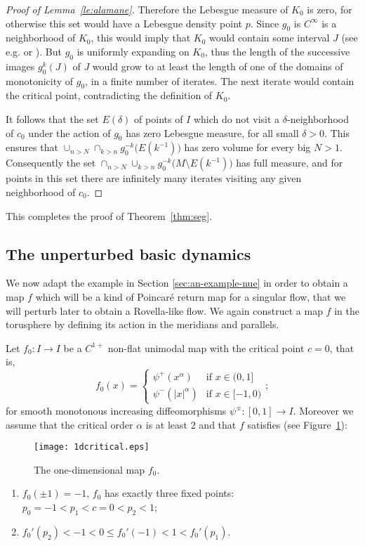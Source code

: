 \documentclass[reqno,12pt,a4paper]{amsart}
\theoremstyle{plain}
\theoremstyle{definition}
\begin{document}
\begin{proof}[Proof of Lemma~\ref{le:alamane}]
  Therefore the Lebesgue measure of $K_0$ is zero, for
  otherwise this set would have a Lebesgue density point
  $p$. Since $g_0$ is $C^\infty$ is a neighborhood of $K_0$,
  this would imply that $K_0$ would contain some interval
  $J$ (see e.g. \cite{Vi97b} or
  \cite{alves-luzzatto-pinheiro2005}). But $g_0$ is
  uniformly expanding on $K_0$, thus the length of the
  successive images $g_0^k(J)$ of $J$ would grow to at least
  the length of one of the domains of monotonicity of $g_0$,
  in a finite number of iterates. The next iterate would
  contain the critical point, contradicting the definition
  of $K_0$.

  It follows that the set $E(\delta)$ of points of $I$ which
  do not visit a $\delta$-neighborhood of $c_0$ under the
  action of $g_0$ has zero Lebesgue measure, for all small
  $\delta>0$. This ensures that $\cup_{n>N}\cap_{k>n}
  g_0^{-k}\big( E(k^{-1})\big)$ has zero volume for every
  big $N>1$. Consequently the set $\cap_{n>N}\cup_{k>n}
  g_0^{-k}\big(M\setminus E(k^{-1})\big)$ has full measure,
  and for points in this set there are infinitely many
  iterates visiting any given neighborhood of $c_0$.
\end{proof}

This completes the proof of Theorem~\ref{thm:seg}.

\subsection{The unperturbed basic dynamics}
\label{sec:unpert-basic-dynamic}

We now adapt the example in Section \ref{sec:an-example-nue}
in order to obtain a map $f$ which will be a kind of
Poincar\'e return map for a singular flow, that we will
perturb later to obtain a Rovella-like flow.  We again
construct a map $f$ in the torusphere by defining its action
in the meridians and parallels.

Let $f_0: I \to I$ be a $C^{1+}$ non-flat unimodal map with the
critical point $c=0$, that is,
$$
f_0(x)=\begin{cases}
\psi^+(x^\alpha) & \text{if   } x\in(0,1]\\
\psi^-(|x|^\alpha) & \text{if   } x\in[-1,0)
\end{cases};
$$
for smooth monotonous increasing diffeomorphisms
$\psi^\pm:[0,1]\to I$.  Moreover we assume that the critical
order $\alpha$ is at least $2$ and that $f$ satisfies (see
Figure~\ref{fig:1dcritical}):
\begin{figure}[htbp]
\begin{center}
  \texttt{[image: 1dcritical.eps]}
\end{center}
\caption{The one-dimensional map $f_0$.}
  \label{fig:1dcritical}
\end{figure}
\begin{enumerate}
\item $f_0(\pm1)=-1$, $f_0$ has exactly three fixed points:
  $p_0=-1< p_1 <c=0 < p_2<1$;
\item $f_0'(p_2)<-1<0 \leq f_0'(-1) < 1< f_0'(p_1)$.
\end{enumerate}
\end{document}
